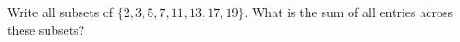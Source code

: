 Write all subsets of $\{2,3,5,7,11,13,17,19\}$. What is the sum of all entries across these subsets?
